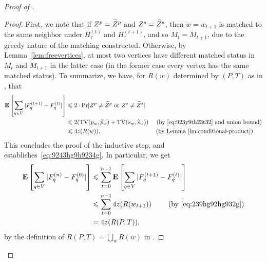 \begin{proof}[Proof of ]
\begin{proof}
First, we note that if $Z^p=\widetilde{Z}^p$ and $Z^s = \widetilde{Z}^s$, then $w=w_{t+1}$ is matched to the same neighbor under $H_\tau^{(t)}$ and $H_\tau^{(t+1)}$, and so $M_t=M_{t+1}$, due to the greedy nature of the matching constructed. Otherwise, by Lemma~\ref{lem:freevertices}, at most two vertices have different matched status in $M_t$ and $M_{t+1}$ in the latter case (in the former case every vertex has the same matched status). To summarize, we have, for $R(w)$ determined by $(P,T)$ as in , that 
\begin{equation}\label{eq:239hg92hg932g}
\begin{split}
{\bf E}\left[\sum_{q\in V} |F^{(t+1)}_q-F^{(t)}_q|\right]&\leqslant 2\cdot \Pr[Z^p\neq \widetilde{Z}^p\text{~or~}Z^s\neq \widetilde{Z}^s]\\
&\leqslant 2(\operatorname{TV}(p_w, \widetilde{p}_w)+\operatorname{TV}(s_w, \widetilde{s}_w))\text{~~~~(by~\eqref{eq:923y9th23t32} and union bound)}\\
&\leqslant 4z(R(w)).\text{~~~~~~~~~~~~~~~~~~~~~~~~~~~~(by~Lemma~\ref{lm:conditional-product})}
\end{split}
\end{equation}
This concludes the proof of the inductive step, and establishes~\eqref{eq:9243hg9h9234g}. In particular, we get
\begin{equation}\label{eq:239hg23g}
\begin{split}
{\bf E}\left[\sum_{q\in V} |F^{(n)}_q-F^{(0)}_q|\right]&\leqslant \sum_{t=0}^{n-1} {\bf E}\left[\sum_{q\in V} |F^{(t+1)}_q-F^{(t)}_q|\right]\\
&\leqslant \sum_{t=0}^{n-1} 4z(R(w_{t+1})) \text{~~~~~~~(by~\eqref{eq:239hg92hg932g})}\\
&= 4z(R(P,T)),
\end{split}
\end{equation}
by the definition of $R(P,T) = \bigcup_w R(w)$ in .



\end{proof}
\end{proof}
